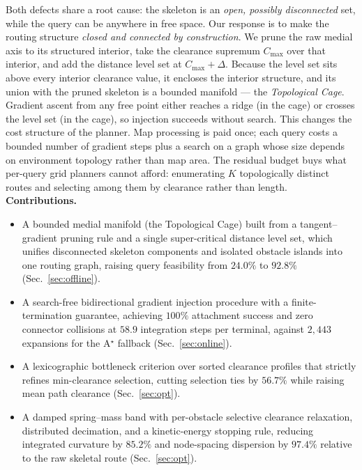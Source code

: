 \documentclass[conference]{IEEEtran}
\begin{document}
Both defects share a root cause: the skeleton is an \emph{open, possibly disconnected} set, while the query can be anywhere in free space. Our response is to make the routing structure \emph{closed and connected by construction}. We prune the raw medial axis to its structured interior, take the clearance supremum $C_{\max}$ over that interior, and add the distance level set at $C_{\max}+\Delta$. Because the level set sits above every interior clearance value, it encloses the interior structure, and its union with the pruned skeleton is a bounded manifold --- the \emph{Topological Cage}. Gradient ascent from any free point either reaches a ridge (in the cage) or crosses the level set (in the cage), so injection succeeds without search.
This changes the cost structure of the planner. Map processing is paid once; each query costs a bounded number of gradient steps plus a search on a graph whose size depends on environment topology rather than map area. The residual budget buys what per-query grid planners cannot afford: enumerating $K$ topologically distinct routes and selecting among them by clearance rather than length.
\textbf{Contributions.}
\begin{itemize}
  \item A bounded medial manifold (the Topological Cage) built from a tangent--gradient pruning rule and a single super-critical distance level set, which unifies disconnected skeleton components and isolated obstacle islands into one routing graph, raising query feasibility from $24.0\%$ to $92.8\%$ (Sec.~\ref{sec:offline}).
  \item A search-free bidirectional gradient injection procedure with a finite-termination guarantee, achieving $100\%$ attachment success and zero connector collisions at $58.9$ integration steps per terminal, against $2{,}443$ expansions for the A$^\star$ fallback (Sec.~\ref{sec:online}).
  \item A lexicographic bottleneck criterion over sorted clearance profiles that strictly refines min-clearance selection, cutting selection ties by $56.7\%$ while raising mean path clearance (Sec.~\ref{sec:opt}).
  \item A damped spring--mass band with per-obstacle selective clearance relaxation, distributed decimation, and a kinetic-energy stopping rule, reducing integrated curvature by $85.2\%$ and node-spacing dispersion by $97.4\%$ relative to the raw skeletal route (Sec.~\ref{sec:opt}).
\end{itemize}
\end{document}
